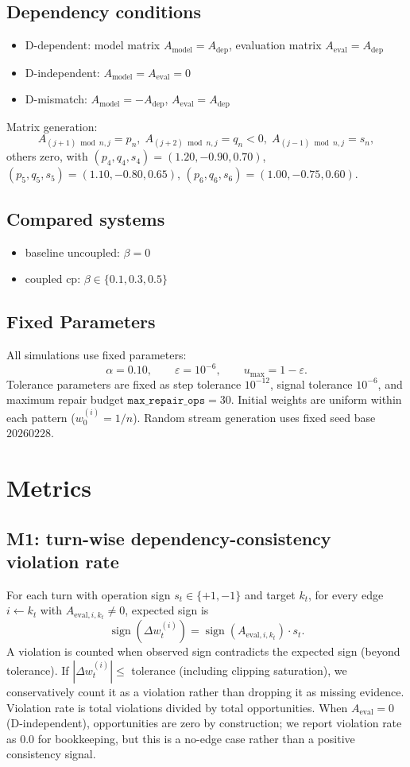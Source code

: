 \documentclass[11pt,a4paper]{article}
\begin{document}
\subsection{Dependency conditions}
\begin{itemize}
  \item D-dependent: model matrix \(A_{\text{model}}=A_{\text{dep}}\), evaluation matrix \(A_{\text{eval}}=A_{\text{dep}}\)
  \item D-independent: \(A_{\text{model}}=A_{\text{eval}}=0\)
  \item D-mismatch: \(A_{\text{model}}=-A_{\text{dep}}\), \(A_{\text{eval}}=A_{\text{dep}}\)
\end{itemize}

Matrix generation:
\[
A_{(j+1)\bmod n,j}=p_n,\;
A_{(j+2)\bmod n,j}=q_n<0,\;
A_{(j-1)\bmod n,j}=s_n,
\]
others zero, with
\((p_4,q_4,s_4)=(1.20,-0.90,0.70)\),
\((p_5,q_5,s_5)=(1.10,-0.80,0.65)\),
\((p_6,q_6,s_6)=(1.00,-0.75,0.60)\).

\subsection{Compared systems}
\begin{itemize}
  \item baseline uncoupled: \(\beta=0\)
  \item coupled cp: \(\beta\in\{0.1,0.3,0.5\}\)
\end{itemize}

\subsection{Fixed Parameters}
All simulations use fixed parameters:
\[
\alpha=0.10,\qquad \varepsilon=10^{-6},\qquad u_{\max}=1-\varepsilon.
\]
Tolerance parameters are fixed as step tolerance \(10^{-12}\), signal tolerance \(10^{-6}\), and maximum repair budget \(\texttt{max\_repair\_ops}=30\).
Initial weights are uniform within each pattern (\(w_0^{(i)}=1/n\)).
Random stream generation uses fixed seed base \(20260228\).

\section{Metrics}
\subsection{M1: turn-wise dependency-consistency violation rate}
For each turn with operation sign \(s_t\in\{+1,-1\}\) and target \(k_t\), for every edge \(i\leftarrow k_t\) with \(A_{\text{eval},i,k_t}\neq 0\), expected sign is
\[
\operatorname{sign}(\Delta w_t^{(i)}) = \operatorname{sign}(A_{\text{eval},i,k_t})\cdot s_t.
\]
A violation is counted when observed sign contradicts the expected sign (beyond tolerance). If \(|\Delta w_t^{(i)}|\le\) tolerance (including clipping saturation), we conservatively count it as a violation rather than dropping it as missing evidence.
Violation rate is total violations divided by total opportunities.
When \(A_{\text{eval}}=0\) (D-independent), opportunities are zero by construction; we report violation rate as 0.0 for bookkeeping, but this is a no-edge case rather than a positive consistency signal.
\end{document}
